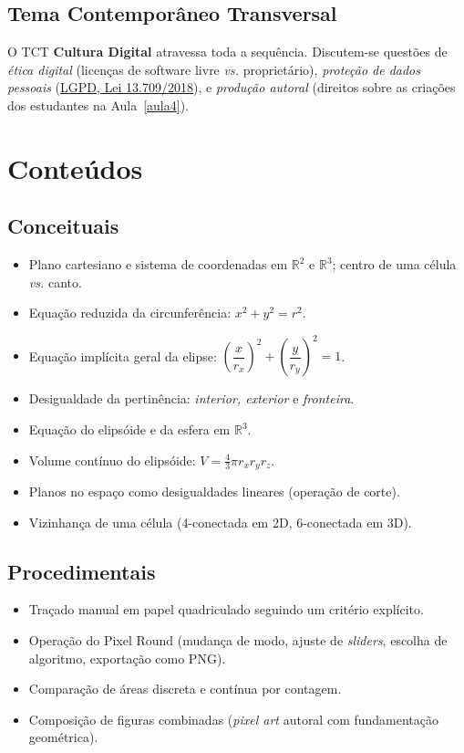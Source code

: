 \documentclass[12pt,a4paper]{scrartcl}
\newcommand{\acc}[1]{\textcolor{accent}{\textbf{#1}}}
\begin{document}
\subsection{Tema Contemporâneo Transversal}

O TCT \acc{Cultura Digital} atravessa toda a sequência. Discutem-se questões de \emph{ética digital} (licenças de software livre \emph{vs.} proprietário), \emph{proteção de dados pessoais} (\href{https://www.planalto.gov.br/ccivil_03/_ato2015-2018/2018/lei/l13709.htm}{LGPD, Lei 13.709/2018}), e \emph{produção autoral} (direitos sobre as criações dos estudantes na Aula~\ref{aula4}).

\section{Conteúdos}\label{sec:conteudos}

\subsection{Conceituais}
\begin{itemize}[leftmargin=1.3em,itemsep=0.15em,topsep=0.3em]
  \item Plano cartesiano e sistema de coordenadas em $\mathbb{R}^2$ e $\mathbb{R}^3$; centro de uma célula \emph{vs.} canto.
  \item Equação reduzida da circunferência: $x^2 + y^2 = r^2$.
  \item Equação implícita geral da elipse: $\left(\dfrac{x}{r_x}\right)^{\!2} + \left(\dfrac{y}{r_y}\right)^{\!2} = 1$.
  \item Desigualdade da pertinência: \emph{interior, exterior} e \emph{fronteira}.
  \item Equação do elipsóide e da esfera em $\mathbb{R}^3$.
  \item Volume contínuo do elipsóide: $V = \tfrac{4}{3}\pi r_x r_y r_z$.
  \item Planos no espaço como desigualdades lineares (operação de corte).
  \item Vizinhança de uma célula (4-conectada em 2D, 6-conectada em 3D).
\end{itemize}

\subsection{Procedimentais}
\begin{itemize}[leftmargin=1.3em,itemsep=0.15em,topsep=0.3em]
  \item Traçado manual em papel quadriculado seguindo um critério explícito.
  \item Operação do Pixel Round (mudança de modo, ajuste de \emph{sliders}, escolha de algoritmo, exportação como PNG).
  \item Comparação de áreas discreta e contínua por contagem.
  \item Composição de figuras combinadas (\emph{pixel art} autoral com fundamentação geométrica).
\end{itemize}
\end{document}
